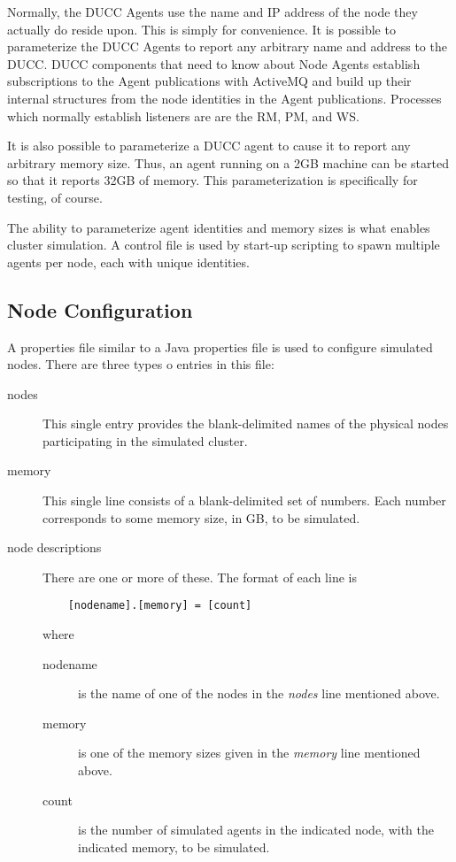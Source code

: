     Normally, the DUCC Agents use the name and IP address of the node 
    they actually do reside upon. This is simply for convenience. 
    It is possible to parameterize the DUCC Agents to report any arbitrary
    name and address to the DUCC.  DUCC components that need to know
    about Node Agents establish subscriptions to the Agent publications
    with ActiveMQ and build up their internal structures from the 
    node identities in the Agent publications.  Processes which normally 
    establish listeners are are the RM, PM, and WS.

    It is also possible to parameterize a DUCC agent to cause it to
    report any arbitrary memory size.  Thus, an agent running on a
    2GB machine can be started so that it reports 32GB of memory. This
    parameterization is specifically for testing, of course.

    The ability to parameterize agent identities and memory sizes is what enables 
    cluster simulation.  A control file is used by start-up scripting
    to spawn multiple agents per node, each with unique identities. 

    \subsection{Node Configuration}

    A properties file similar to a Java properties file is used to configure
    simulated nodes.  There are three types o entries in this file:
    \begin{description}
      \item[nodes] This single entry provides the blank-delimited names of the physical nodes
        participating in the simulated cluster.
      \item[memory] This single line consists of a blank-delimited set
        of numbers.  Each number corresponds to some memory size, in
        GB, to be simulated.
      \item[node descriptions] There are one or more of these.  The format
        of each line is
\begin{verbatim}
    [nodename].[memory] = [count]
\end{verbatim}
        where
        \begin{description}
          \item[nodename] is the name of one of the nodes in the {\em nodes}
            line mentioned above.
          \item[memory] is one of the memory sizes given in the {\em memory}
            line mentioned above.
          \item[count] is the number of simulated agents in the indicated
            node, with the indicated memory, to be simulated.
        \end{description}
      \end{description}

